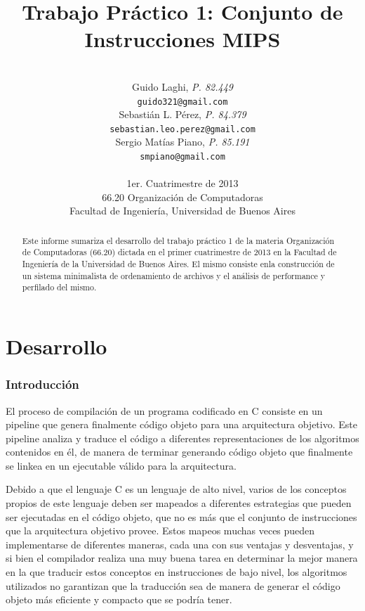 \documentclass[a4paper,11pt]{article}
\title{\textbf{Trabajo Práctico 1: Conjunto de Instrucciones MIPS}}
\author{\\
  Guido Laghi, \textit{P. 82.449}                                  \\
  \texttt{guido321@gmail.com}                                      \\ [2.5ex]
  Sebastián L. Pérez, \textit{P. 84.379}                           \\
  \texttt{sebastian.leo.perez@gmail.com}                           \\ [2.5ex]
  Sergio Matías Piano, \textit{P. 85.191}                          \\
  \texttt{smpiano@gmail.com}                                       \\ [2.5ex]
                                                                   \\
  \normalsize{1er. Cuatrimestre de 2013}                           \\
  \normalsize{66.20 Organización de Computadoras}                  \\
  \normalsize{Facultad de Ingeniería, Universidad de Buenos Aires} \\
}
\date{}
\begin{document}
\thispagestyle{empty}
\maketitle

\begin{abstract}

  Este informe sumariza el desarrollo del trabajo práctico 1 de la materia
  Organización de Computadoras (66.20) dictada en el primer cuatrimestre de
  2013 en la Facultad de Ingeniería de la Universidad de Buenos Aires. El mismo
  consiste enla construcción de un sistema minimalista de ordenamiento de
  archivos y el análisis de performance y perfilado del mismo.

\end{abstract}

\clearpage

\tableofcontents
\clearpage


\part{Desarrollo}

\section{Introducción}

El proceso de compilación de un programa codificado en C consiste en un
pipeline que genera finalmente código objeto para una arquitectura objetivo.
Este pipeline analiza y traduce el código a diferentes representaciones de los
algoritmos contenidos en él, de manera de terminar generando código objeto que
finalmente se linkea en un ejecutable válido para la arquitectura.

Debido a que el lenguaje C es un lenguaje de alto nivel, varios de los
conceptos propios de este lenguaje deben ser mapeados a diferentes estrategias
que pueden ser ejecutadas en el código objeto, que no es más que el conjunto de
instrucciones que la arquitectura objetivo provee. Estos mapeos muchas veces
pueden implementarse de diferentes maneras, cada una con sus ventajas y
desventajas, y si bien el compilador realiza una muy buena tarea en determinar
la mejor manera en la que traducir estos conceptos en instrucciones de bajo
nivel, los algoritmos utilizados no garantizan que la traducción sea de manera
de generar el código objeto más eficiente y compacto que se podría tener.
\end{document}
